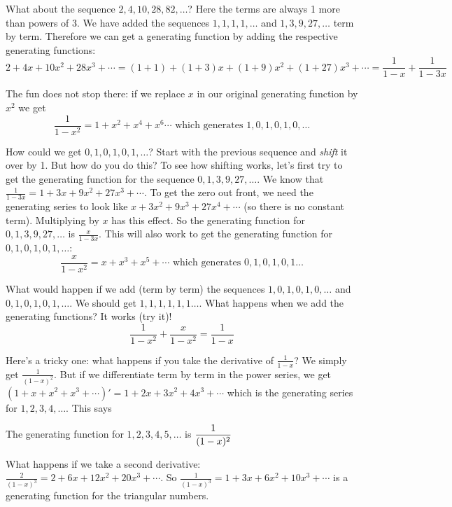 \documentclass[12pt]{article}
\begin{document}
What about the sequence $2, 4, 10, 28, 82, \ldots$?  Here the terms are always 1 more than powers of 3.  We have added the sequences $1,1,1,1,\ldots$ and $1,3,9, 27,\ldots$ term by term.  Therefore we can get a generating function by adding the respective generating functions:
 \[2 + 4x + 10x^2 + 28x^3 + \cdots  = (1 + 1) + (1 + 3)x + (1 + 9)x^2 + (1 + 27)x^3 + \cdots = \frac{1}{1-x} + \frac{1}{1-3x}\]
 
The fun does not stop there: if we replace $x$ in our original generating function by $x^2$ we get
 \[\frac{1}{1-x^2} = 1 + x^2  + x^4 + x^6\cdots \mbox{ which generates } 1, 0, 1, 0, 1, 0, \ldots\]
 
How could we get $0,1,0,1,0,1,\ldots$?  Start with the previous sequence and {\em shift} it over by 1.  But how do you do this?  To see how shifting works, let's first try to get the generating function for the sequence $0, 1, 3, 9, 27, \ldots$.  We know that $\frac{1}{1-3x} = 1 + 3x + 9x^2 + 27x^3 + \cdots$.  To get the zero out front, we need the generating series to look like $x + 3x^2 + 9x^3 + 27x^4+ \cdots$ (so there is no constant term).  Multiplying by $x$ has this effect.  So the generating function for $0, 1, 3, 9, 27, \ldots$ is $\frac{x}{1-3x}$.  This will also work to get the generating function for $0,1,0,1,0,1,\ldots$:
 \[\frac{x}{1-x^2} = x + x^3 + x^5 + \cdots \mbox{ which generates } 0, 1, 0, 1, 0 , 1 \ldots\]
 
What would happen if we add (term by term) the sequences $1,0,1,0,1,0,\ldots$ and $0,1,0,1,0,1,\ldots$.  We should get $1,1,1,1,1,1\ldots$.  What happens when we add the generating functions?  It works (try it)!
 \[\frac{1}{1-x^2} + \frac{x}{1-x^2} = \frac{1}{1-x}\]
 

Here's a tricky one: what happens if you take the derivative of $\frac{1}{1-x}$?  We simply get $\frac{1}{(1-x)^2}$.  But if we differentiate term by term in the power series, we get $(1 + x + x^2 + x^3 + \cdots)' = 1 + 2x + 3x^2 + 4x^3 + \cdots $ which is the generating series for $1, 2, 3, 4, \ldots$.  This says

\begin{defbox}{}
 The generating function for $1, 2, 3, 4, 5, \ldots$ is $\displaystyle\frac{1}{(1-x)^2}$
\end{defbox}

What happens if we take a second derivative: $\frac{2}{(1-x)^3} = 2 + 6x + 12x^2 + 20x^3 + \cdots$.  So $\frac{1}{(1-x)^3} = 1 + 3x + 6x^2 + 10x^3 + \cdots$ is a generating function for the triangular numbers.
\end{document}
